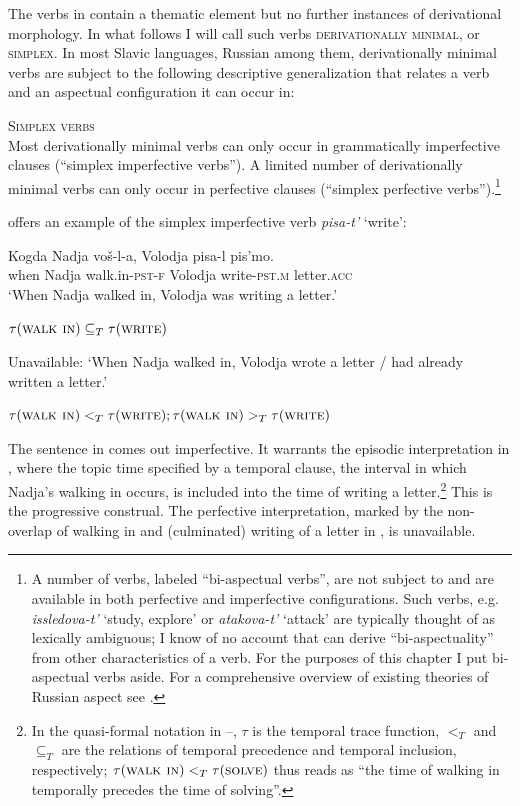 \documentclass[output=paper,colorlinks,citecolor=brown]{langscibook}
\begin{document}
\noindent The verbs in  contain a thematic element but no further instances of derivational morphology. In what follows I will call such verbs \textsc{derivationally minimal}, or \textsc{simplex}. In most Slavic languages, Russian among them, derivationally minimal verbs are subject to the following descriptive generalization that relates a verb and an aspectual configuration it can occur in: 

\eanoraggedright   \textsc{Simplex verbs}\\\label{ex:tatevosov:4}
Most derivationally minimal verbs can only occur in grammatically imperfective clauses (“simplex imperfective verbs”). A limited number of derivationally minimal verbs can only occur in perfective clauses (``simplex perfective verbs'').\footnote{A number of verbs, labeled “bi-aspectual verbs”, are not subject to  and are available in both perfective and imperfective configurations. Such verbs, e.g. \textit{issledova-t'} ‘study, explore’ or \textit{atakova-t’} ‘attack’ are typically thought of as lexically ambiguous; I know of no account that can derive “bi-aspectuality” from other characteristics of a verb. For the purposes of this chapter I put bi-aspectual verbs aside. For a comprehensive overview of existing theories of Russian aspect see .}
\z

\noindent {} offers an example of the simplex imperfective verb \textit{pisa-t’} ‘write’:

\ea\label{ex:tatevosov:5}
\gll Kogda   Nadja   voš-l-a,   Volodja   pisa-l   pis’mo. \\
  when  Nadja  walk.in-\textsc{pst-f}  Volodja  write-\textsc{pst.m}  letter.\textsc{acc}\\

\ea   ‘When Nadja walked in, Volodja was writing a letter.’

\glt  ${\tau}(\textsc{walk in}) \subseteq_T \tau(\textsc{write})$\label{ex:tatevosov:5a}


\ex   Unavailable: ‘When Nadja walked in, Volodja  wrote a letter / had already written a letter.’

\glt  $\tau(\textsc{walk in}) <_T \tau(\textsc{write}); \tau(\textsc{walk in}) >_T \tau(\textsc{write})$\label{ex:tatevosov:5b}
\z
\z

\noindent The sentence in  comes out imperfective. It warrants the episodic interpretation in , where the topic time specified by a temporal clause, the interval in which Nadja’s walking in occurs, is included into the time of writing a letter.\footnote{In the quasi-formal notation in --, $\tau$ is the temporal trace function, $<_T$ and  $\subseteq_T$ are the relations of temporal precedence and temporal inclusion, respectively; $\tau(\textsc{walk in}) <_T \tau(\textsc{solve})$ thus reads as “the time of walking in temporally precedes the time of solving”.}  This is the progressive construal. The perfective interpretation, marked by the non-overlap of walking in and (culminated) writing of a letter in , is unavailable.
\end{document}
